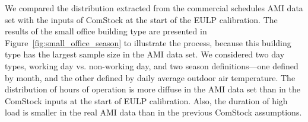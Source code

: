 
We compared the distribution extracted from the commercial schedules AMI data set with the inputs of ComStock at the start of the EULP calibration. The results of the small office building type are presented in Figure~\ref{fig:small_office_season} to illustrate the process, because this building type has the largest sample size in the AMI data set. We considered two day types, working day vs. non-working day, and two season definitions---one defined by month, and the other defined by daily average outdoor air temperature. The distribution of hours of operation is more diffuse in the AMI data set than in the ComStock inputs at the start of EULP calibration. Also, the duration of high load is smaller in the real AMI data than in the previous ComStock assumptions.



